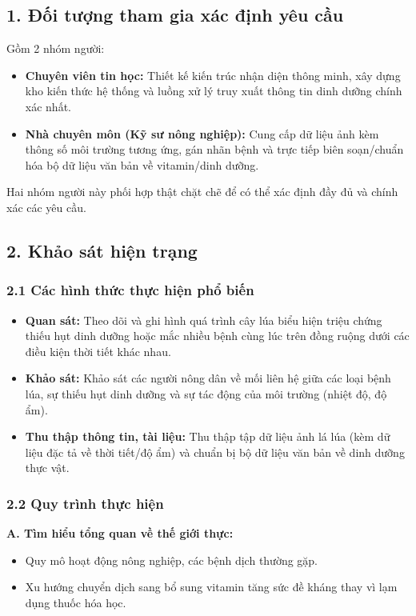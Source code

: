 \documentclass[12pt,a4paper]{article}
\begin{document}
\subsection*{1. Đối tượng tham gia xác định yêu cầu}
Gồm 2 nhóm người:
\begin{itemize}
    \item \textbf{Chuyên viên tin học:} Thiết kế kiến trúc nhận diện thông minh, xây dựng kho kiến thức hệ thống và luồng xử lý truy xuất thông tin dinh dưỡng chính xác nhất.
    \item \textbf{Nhà chuyên môn (Kỹ sư nông nghiệp):} Cung cấp dữ liệu ảnh kèm thông số môi trường tương ứng, gán nhãn bệnh và trực tiếp biên soạn/chuẩn hóa bộ dữ liệu văn bản về vitamin/dinh dưỡng.
\end{itemize}
Hai nhóm người này phối hợp thật chặt chẽ để có thể xác định đầy đủ và chính xác các yêu cầu.

\hrulefill

\subsection*{2. Khảo sát hiện trạng}
\subsubsection*{2.1 Các hình thức thực hiện phổ biến}
\begin{itemize}
    \item \textbf{Quan sát:} Theo dõi và ghi hình quá trình cây lúa biểu hiện triệu chứng thiếu hụt dinh dưỡng hoặc mắc nhiều bệnh cùng lúc trên đồng ruộng dưới các điều kiện thời tiết khác nhau.
    \item \textbf{Khảo sát:} Khảo sát các người nông dân về mối liên hệ giữa các loại bệnh lúa, sự thiếu hụt dinh dưỡng và sự tác động của môi trường (nhiệt độ, độ ẩm).
    \item \textbf{Thu thập thông tin, tài liệu:} Thu thập tập dữ liệu ảnh lá lúa (kèm dữ liệu đặc tả về thời tiết/độ ẩm) và chuẩn bị bộ dữ liệu văn bản về dinh dưỡng thực vật.
\end{itemize}

\subsubsection*{2.2 Quy trình thực hiện}
\textbf{A. Tìm hiểu tổng quan về thế giới thực:}
\begin{itemize}
    \item Quy mô hoạt động nông nghiệp, các bệnh dịch thường gặp.
    \item Xu hướng chuyển dịch sang bổ sung vitamin tăng sức đề kháng thay vì lạm dụng thuốc hóa học.
\end{itemize}
\end{document}
